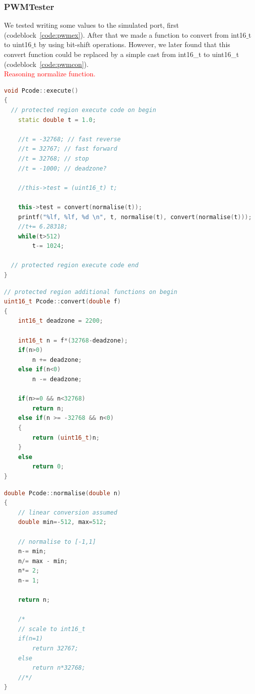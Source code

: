 \documentclass[a4paper,twoside,11pt]{article}
\newcommand{\todo}[1]{{\Large\sc\textcolor{red}{#1}}}
\begin{document}
\subsubsection{PWMTester}
We tested writing some values to the simulated port, first (codeblock~\ref{code:pwmex}).
After that we made a function to convert from int16$\_$t to uint16$\_$t by using bit-shift operations.
However, we later found that this convert function could be replaced by a simple 
cast from int16\_t to uint16\_t (codeblock~\ref{code:pwmcon}). \\
\todo{Reasoning normalize function.}
\begin{lstlisting}[caption=Pcode::execute, label=code:pwmex, language=C++]
void Pcode::execute()
{
  // protected region execute code on begin
	static double t = 1.0;

	//t = -32768; // fast reverse
	//t = 32767; // fast forward
	//t = 32768; // stop
	//t = -1000; // deadzone?

	//this->test = (uint16_t) t;

	this->test = convert(normalise(t));
	printf("%lf, %lf, %d \n", t, normalise(t), convert(normalise(t)));
	//t+= 6.28318;
	while(t>512)
		t-= 1024;

  // protected region execute code end
}
\end{lstlisting}
\begin{lstlisting}[caption=Pcode::convert, label=code:pwmcon, language=C++]
// protected region additional functions on begin
uint16_t Pcode::convert(double f)
{
	int16_t deadzone = 2200;

	int16_t n = f*(32768-deadzone);
	if(n>0)
		n += deadzone;
	else if(n<0)
		n -= deadzone;

	if(n>=0 && n<32768)
		return n;
	else if(n >= -32768 && n<0)
	{
		return (uint16_t)n;
	}
	else
		return 0;
}
\end{lstlisting}
\begin{lstlisting}[caption=Pcode::normalise, label=code:pwmnor, language=C++]
double Pcode::normalise(double n)
{
	// linear conversion assumed
	double min=-512, max=512;

	// normalise to [-1,1]
	n-= min;
	n/= max - min;
	n*= 2;
	n-= 1;

	return n;

	/*
	// scale to int16_t
	if(n=1)
		return 32767;
	else
		return n*32768;
	//*/
}
\end{lstlisting}
\end{document}
